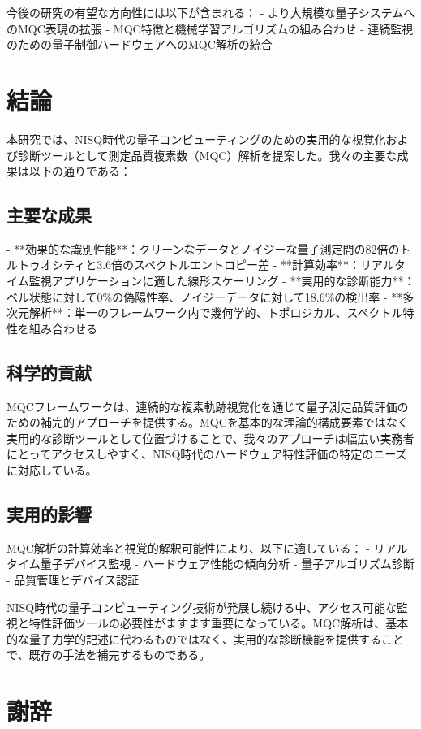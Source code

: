 \documentclass[a4paper,11pt]{article}
\begin{document}
\begin{CJK}{UTF8}{min}
今後の研究の有望な方向性には以下が含まれる：
- より大規模な量子システムへのMQC表現の拡張
- MQC特徴と機械学習アルゴリズムの組み合わせ
- 連続監視のための量子制御ハードウェアへのMQC解析の統合

\section{結論}

本研究では、NISQ時代の量子コンピューティングのための実用的な視覚化および診断ツールとして測定品質複素数（MQC）解析を提案した。我々の主要な成果は以下の通りである：

\subsection{主要な成果}

- **効果的な識別性能**：クリーンなデータとノイジーな量子測定間の82倍のトルトゥオシティと3.6倍のスペクトルエントロピー差
- **計算効率**：リアルタイム監視アプリケーションに適した線形スケーリング
- **実用的な診断能力**：ベル状態に対して0\%の偽陽性率、ノイジーデータに対して18.6\%の検出率
- **多次元解析**：単一のフレームワーク内で幾何学的、トポロジカル、スペクトル特性を組み合わせる

\subsection{科学的貢献}

MQCフレームワークは、連続的な複素軌跡視覚化を通じて量子測定品質評価のための補完的アプローチを提供する。MQCを基本的な理論的構成要素ではなく実用的な診断ツールとして位置づけることで、我々のアプローチは幅広い実務者にとってアクセスしやすく、NISQ時代のハードウェア特性評価の特定のニーズに対応している。

\subsection{実用的影響}

MQC解析の計算効率と視覚的解釈可能性により、以下に適している：
- リアルタイム量子デバイス監視
- ハードウェア性能の傾向分析
- 量子アルゴリズム診断
- 品質管理とデバイス認証

NISQ時代の量子コンピューティング技術が発展し続ける中、アクセス可能な監視と特性評価ツールの必要性がますます重要になっている。MQC解析は、基本的な量子力学的記述に代わるものではなく、実用的な診断機能を提供することで、既存の手法を補完するものである。

\section*{謝辞}


\end{CJK}
\end{document}

